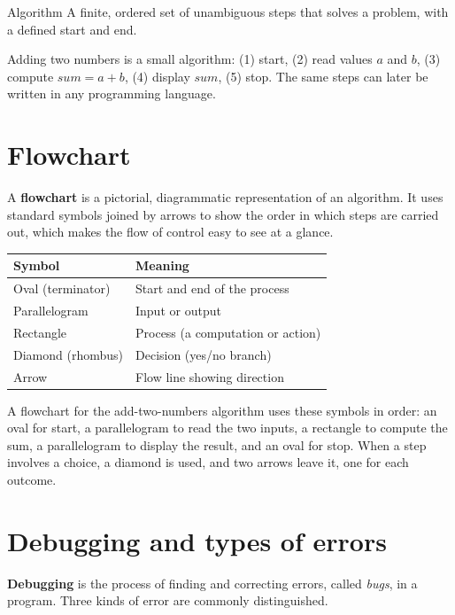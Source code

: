 \begin{definitionbox}{Algorithm}
A finite, ordered set of unambiguous steps that solves a problem, with a
defined start and end.
\end{definitionbox}

\begin{example}
Adding two numbers is a small algorithm: (1) start, (2) read values $a$ and
$b$, (3) compute $sum = a + b$, (4) display $sum$, (5) stop. The same steps
can later be written in any programming language.
\end{example}

\section{Flowchart}
A \textbf{flowchart} is a pictorial, diagrammatic representation of an
algorithm. It uses standard symbols joined by arrows to show the order in
which steps are carried out, which makes the flow of control easy to see at a
glance.

\begin{center}
\begin{tabular}{p{}p{}}
\toprule
\textbf{Symbol} & \textbf{Meaning} \\
\midrule
Oval (terminator) & Start and end of the process \\
Parallelogram & Input or output \\
Rectangle & Process (a computation or action) \\
Diamond (rhombus) & Decision (yes/no branch) \\
Arrow & Flow line showing direction \\
\bottomrule
\end{tabular}
\end{center}

A flowchart for the add-two-numbers algorithm uses these symbols in order: an
oval for start, a parallelogram to read the two inputs, a rectangle to compute
the sum, a parallelogram to display the result, and an oval for stop. When a
step involves a choice, a diamond is used, and two arrows leave it, one for
each outcome.

\section{Debugging and types of errors}
\textbf{Debugging} is the process of finding and correcting errors, called
\emph{bugs}, in a program. Three kinds of error are commonly distinguished.

